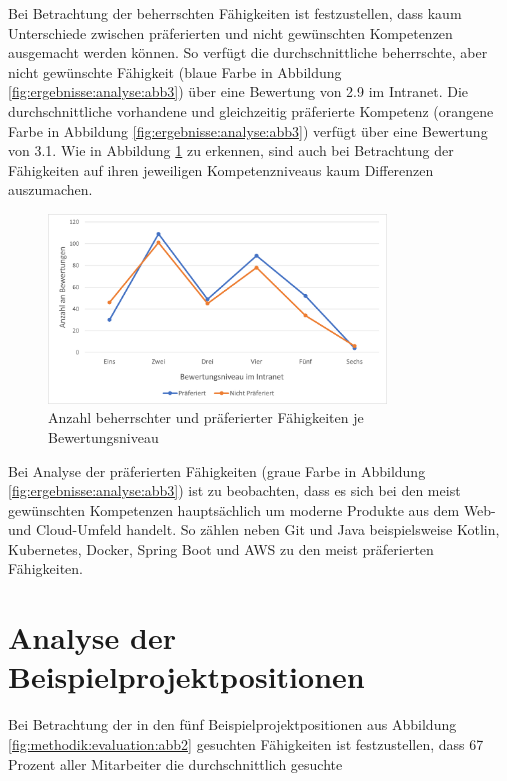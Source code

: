 Bei Betrachtung der beherrschten Fähigkeiten ist festzustellen, dass kaum Unterschiede zwischen präferierten und nicht gewünschten Kompetenzen ausgemacht werden können. So verfügt die durchschnittliche beherrschte, aber nicht gewünschte Fähigkeit (blaue Farbe in Abbildung \ref{fig:ergebnisse:analyse:abb3}) über eine Bewertung von 2.9 im Intranet. Die durchschnittliche vorhandene und gleichzeitig präferierte Kompetenz (orangene Farbe in Abbildung \ref{fig:ergebnisse:analyse:abb3}) verfügt über eine Bewertung von 3.1. Wie in Abbildung \ref{fig:ergebnisse:analyse:abb4} zu erkennen, sind auch bei Betrachtung der Fähigkeiten auf ihren jeweiligen Kompetenzniveaus kaum Differenzen auszumachen.

\begin{figure}[h]
	\centering
	\includegraphics[width=0.8\textwidth]{gfx/bewertungen-je-bewertungsniveau.png}
	\caption{Anzahl beherrschter und präferierter Fähigkeiten je Bewertungsniveau}
	\label{fig:ergebnisse:analyse:abb4}
\end{figure}

Bei Analyse der präferierten Fähigkeiten (graue Farbe in Abbildung \ref{fig:ergebnisse:analyse:abb3}) ist zu beobachten, dass es sich bei den meist gewünschten Kompetenzen hauptsächlich um moderne Produkte aus dem Web- und Cloud-Umfeld handelt. So zählen neben Git und Java beispielsweise Kotlin, Kubernetes, Docker, Spring Boot und AWS zu den meist präferierten Fähigkeiten.

\section{Analyse der Beispielprojektpositionen}
\label{ch:ergebnisse:projekte}
Bei Betrachtung der in den fünf Beispielprojektpositionen aus Abbildung \ref{fig:methodik:evaluation:abb2} gesuchten Fähigkeiten ist festzustellen, dass 67 Prozent aller Mitarbeiter die durchschnittlich gesuchte 

